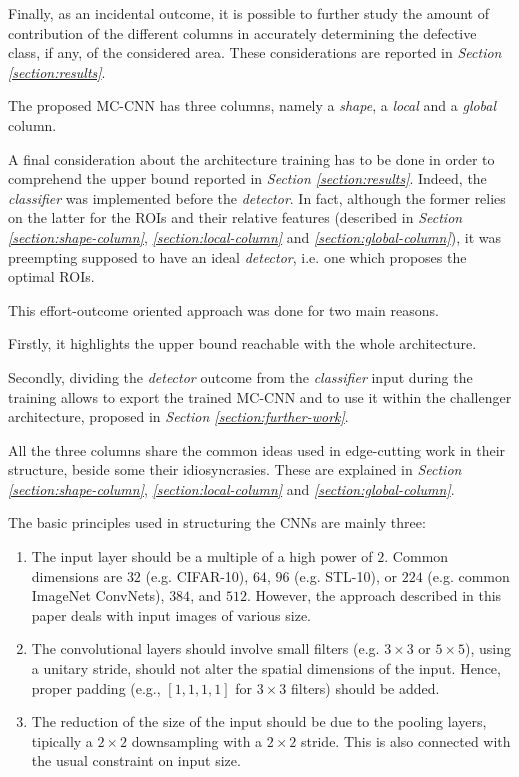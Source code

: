     \par{
        Finally, as an incidental outcome, it is possible to further study the amount of contribution of the different columns in accurately determining the defective class, if any, of the considered area. These considerations are reported in \emph{Section \ref{section:results}}.
    }
    \par{
        The proposed MC-CNN has three columns, namely a \emph{shape}, a \emph{local} and a \emph{global} column.
    }
    \par{
        A final consideration about the architecture training has to be done in order to comprehend the upper bound reported in \emph{Section \ref{section:results}}. Indeed, the \emph{classifier} was implemented before the \emph{detector}. In fact, although the former relies on the latter for the ROIs and their relative features (described in \emph{Section \ref{section:shape-column}}, \emph{\ref{section:local-column}} and \emph{\ref{section:global-column}}), it was preempting supposed to have an ideal \emph{detector}, i.e. one which proposes the optimal ROIs.
    }
    \par{
        This effort-outcome oriented approach was done for two main reasons.
    }
    \par{
        Firstly, it highlights the upper bound reachable with the whole architecture.
    }
    \par{
        Secondly, dividing the \emph{detector} outcome from the \emph{classifier} input during the training allows to export the trained MC-CNN and to use it within the challenger architecture, proposed in \emph{Section \ref{section:further-work}}.
    }
    \par{
        All the three columns share the common ideas used in edge-cutting work \cite{stanford:cs231n} in their structure, beside some their idiosyncrasies. These are explained in \emph{Section \ref{section:shape-column}}, \emph{\ref{section:local-column}} and \emph{\ref{section:global-column}}.
    }
    \par{
        The basic principles used in structuring the CNNs are mainly three:
        \begin{enumerate}
            \item The input layer should be a multiple of a high power of $2$. Common dimensions are $32$ (e.g. CIFAR-10), $64$, $96$ (e.g. STL-10), or $224$ (e.g. common ImageNet ConvNets), $384$, and $512$. However, the approach described in this paper deals with input images of various size.
            \item The convolutional layers should involve small filters (e.g. $3\times 3$ or $5\times5$), using a unitary stride, should not alter the spatial dimensions of the input. Hence, proper padding (e.g., $\left[1,1,1,1\right]$ for $3\times 3$ filters) should be added.
            \item The reduction of the size of the input should be due to the pooling layers, tipically a $2\times 2$ downsampling with a $2\times 2$ stride. This is also connected with the usual constraint on input size.
        \end{enumerate}
    }
